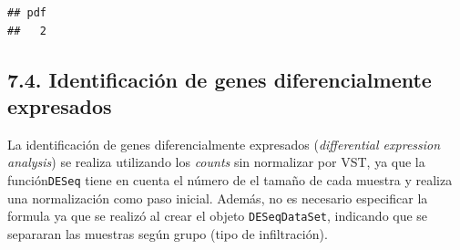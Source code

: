 \documentclass[
]{article}
\newenvironment{Shaded}{\begin{snugshade}}{\end{snugshade}}
\newcommand{\DataTypeTok}[1]{\textcolor[rgb]{0.13,0.29,0.53}{#1}}
\newcommand{\DecValTok}[1]{\textcolor[rgb]{0.00,0.00,0.81}{#1}}
\newcommand{\KeywordTok}[1]{\textcolor[rgb]{0.13,0.29,0.53}{\textbf{#1}}}
\newcommand{\NormalTok}[1]{#1}
\newcommand{\OperatorTok}[1]{\textcolor[rgb]{0.81,0.36,0.00}{\textbf{#1}}}
\newcommand{\StringTok}[1]{\textcolor[rgb]{0.31,0.60,0.02}{#1}}
\begin{document}
\begin{Shaded}
\end{Shaded}

\begin{verbatim}
## pdf 
##   2
\end{verbatim}

\hypertarget{identificaciuxf3n-de-genes-diferencialmente-expresados}{%
\subsection{7.4. Identificación de genes diferencialmente
expresados}\label{identificaciuxf3n-de-genes-diferencialmente-expresados}}

La identificación de genes diferencialmente expresados
(\emph{differential expression analysis}) se realiza utilizando los
\emph{counts} sin normalizar por VST, ya que la función\texttt{DESeq}
tiene en cuenta el número de el tamaño de cada muestra y realiza una
normalización como paso inicial. Además, no es necesario especificar la
formula ya que se realizó al crear el objeto \texttt{DESeqDataSet},
indicando que se separaran las muestras según grupo (tipo de
infiltración).
\end{document}
